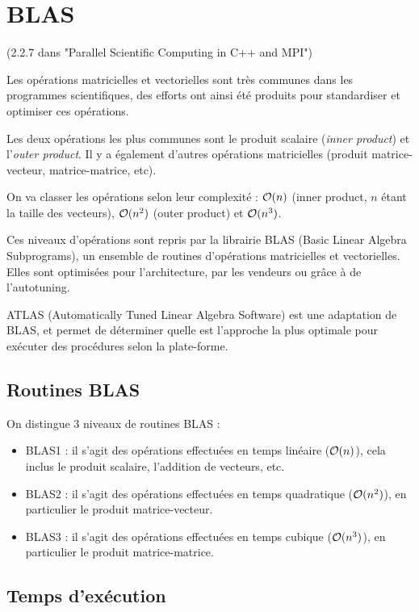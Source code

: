 \section{BLAS}

(2.2.7 dans "Parallel Scientific Computing in C++ and MPI")

Les opérations matricielles et vectorielles sont très communes dans les programmes scientifiques, des efforts ont ainsi été produits pour standardiser et optimiser ces opérations.

Les deux opérations les plus communes sont le produit scalaire (\textit{inner product}) et l'\textit{outer product}. Il y a également d'autres opérations matricielles (produit matrice-vecteur, matrice-matrice, etc).


On va classer les opérations selon leur complexité : $\mathcal{O}(n)$ (inner product, $n$ étant la taille des vecteurs), $\mathcal{O}(n^2)$ (outer product) et $\mathcal{O}(n^3)$.

Ces niveaux d'opérations sont repris par la librairie BLAS (Basic Linear Algebra Subprograms), un ensemble de routines d'opérations matricielles et vectorielles. Elles sont optimisées pour l'architecture, par les vendeurs ou grâce à de l'autotuning.

ATLAS (Automatically Tuned Linear Algebra Software) est une adaptation de BLAS, et permet de déterminer quelle est l'approche la plus optimale pour exécuter des procédures selon la plate-forme.

	\subsection{Routines BLAS}
On distingue 3 niveaux de routines BLAS :

\begin{itemize}
	\item BLAS1 : il s'agit des opérations effectuées en temps linéaire ($\mathcal{O}(n)$), cela inclus le produit scalaire, l'addition de vecteurs, etc.
	\item BLAS2 : il s'agit des opérations effectuées en temps quadratique ($\mathcal{O}(n^2)$), en particulier le produit matrice-vecteur.
	\item BLAS3 : il s'agit des opérations effectuées en temps cubique ($\mathcal{O}(n^3)$), en particulier le produit matrice-matrice.
\end{itemize}

	\subsection{Temps d'exécution}
	
